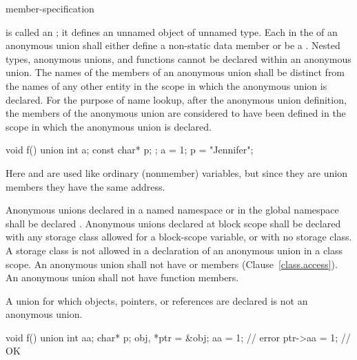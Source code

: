 \begin{ncbnftab}
 \terminal{\{} member-specification \terminal{\}} \terminal{;}
\end{ncbnftab}

is called an ; it defines an unnamed object of unnamed
type. Each  in the 
of an anonymous union shall either define a non-static data member or be a
.
\enternote
Nested types, anonymous unions, and functions cannot be declared within an anonymous
union.
\exitnote
The names of the members of an anonymous union shall be distinct from
the names of any other entity in the scope in which the anonymous union
is declared. For the purpose of name lookup, after the anonymous union
definition, the members of the anonymous union are considered to have
been defined in the scope in which the anonymous union is declared.
%
\enterexample

\begin{codeblock}
void f() {
  union { int a; const char* p; };
  a = 1;
  p = "Jennifer";
}
\end{codeblock}

Here  and  are used like ordinary (nonmember)
variables, but since they are union members they have the same address.
\exitexample

\pnum
{}%
%
Anonymous unions declared in a named namespace or in the global
namespace shall be declared . Anonymous unions declared at
block scope shall be declared with any storage class allowed for a
block-scope variable, or with no storage class. A storage class is not
allowed in a declaration of an anonymous union in a class scope.
%
%
An anonymous union shall not have  or 
members (Clause~\ref{class.access}). An anonymous union shall not have
function members.

\pnum
A union for which objects, pointers, or references are declared is not an anonymous union.
\enterexample

\begin{codeblock}
void f() {
  union { int aa; char* p; } obj, *ptr = &obj;
  aa = 1;                         // error
  ptr->aa = 1;                    // OK
}
\end{codeblock}

